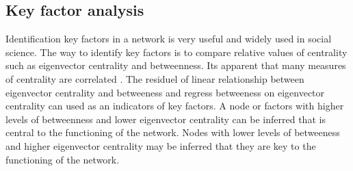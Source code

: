 \subsection*{Key factor analysis}

Identification key factors in a network is very useful and widely used in social science. The way to identify key factors is to compare relative values of centrality such as eigenvector centrality and betweenness. Its apparent that many measures of centrality are correlated \cite{Valente_2008}.  The residuel of linear relationship between eigenvector centrality and betweeness and regress betweeness on eigenvector centrality can used as an indicators of key factors. A node or factors with higher levels of betweenness and lower eigenvector centrality can be inferred that is central to the functioning of the network. Nodes with lower levels of betweeness and higher eigenvector centrality may be inferred that they are key to the functioning of the network.